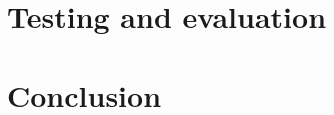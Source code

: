 \documentclass[oribibl]{llncs}
\begin{document}








\section{Testing and evaluation}









\section{Conclusion}







%
\end{document}
